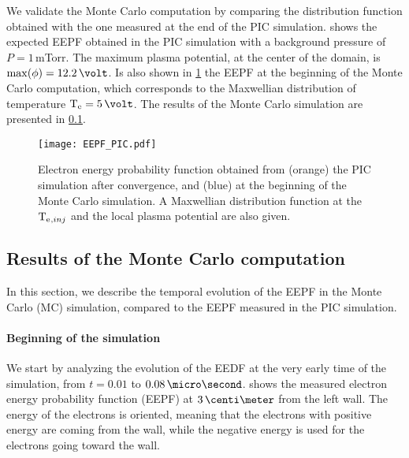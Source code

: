     We validate the Monte Carlo computation by comparing the distribution function obtained with the one measured at the end of the \ac{PIC} simulation.
     shows the expected EEPF obtained in the \ac{PIC} simulation with a background pressure of $P=1$\,mTorr.
    The maximum plasma potential, at the center of the domain, is $\max(\phi)=12.2\,\volt$.
    Is also shown in \cref{fig-EEPF_start_end} the EEPF at the beginning of the Monte Carlo computation, which corresponds to the Maxwellian distribution of temperature $\Te=5\,\volt$.
    The results of the Monte Carlo simulation are presented in \cref{subsec-MCMresults}.

    \begin{figure}[!hbt]
      \centering
      \texttt{[image: EEPF\_PIC.pdf]}
      \caption{Electron energy probability function obtained from (orange) the PIC simulation after convergence, and (blue) at the beginning of the Monte Carlo simulation. A Maxwellian distribution function at the $\mathrm{T_e}{}_{,inj}$ and the local plasma potential are also given.}
      \label{fig-EEPF_start_end}
    \end{figure}

  \subsection{Results of the Monte Carlo computation} \label{subsec-MCMresults}
    In this section, we describe the temporal evolution of the EEPF in the Monte Carlo (MC) simulation, compared to the EEPF measured in the PIC simulation.
    \paragraph{Beginning of the simulation\\ }
    We start by analyzing the evolution of the EEDF at the very early time of the simulation, from $t=0.01$ to $0.08\,\micro\second$.
     shows the measured electron energy probability function (EEPF) at $3\,\centi\meter$ from the left wall.
    The energy of the electrons is oriented, meaning that the electrons with positive energy are coming from the wall, while the negative energy is used for the electrons going toward the wall.

